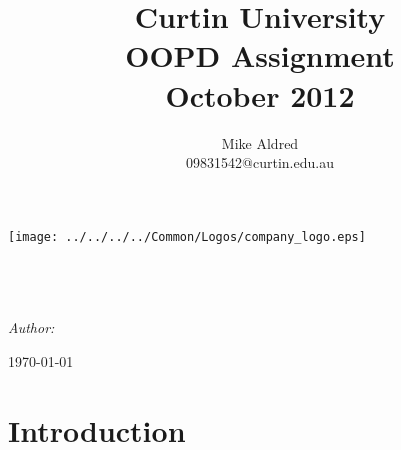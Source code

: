 \documentclass[a4paper]{book}
\title{ Curtin University \\ OOPD Assignment \\ October 2012 }
\author{ Mike Aldred \\ 09831542@curtin.edu.au }
\begin{document}
\makeatletter
\renewcommand{\maketitle}{
  \begin{titlepage}
    \begin{center}
      \texttt{[image: ../../../../Common/Logos/company\_logo.eps]}\\[1cm]
      \HRule \\[0.4cm]
             { \huge \bfseries \@title}\\[0.4cm]
             \HRule \\[1.5cm]

             \begin{minipage}{0.4\textwidth}
               \begin{flushleft} \large
                 \emph{Author:}\\
                 \@author
               \end{flushleft}
             \end{minipage}

             \vfill

             {\large \today}
    \end{center}
  \end{titlepage}
}
\makeatother

\pagestyle{empty}

\maketitle

\frontmatter
\tableofcontents
\mainmatter
{}
\pagestyle{fancy}

\chapter{Introduction}


\end{document}
